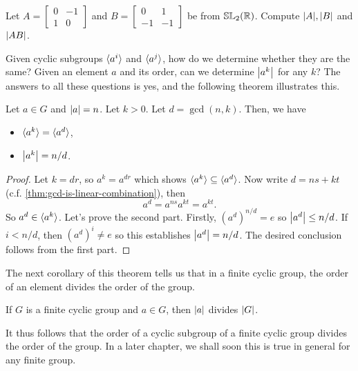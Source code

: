 \documentclass[./algebra-notes.tex]{subfiles}
\begin{document}
\begin{exercise}
    Let $A = \begin{bmatrix} 0 & -1\\ 1 & 0 \end{bmatrix}$ and $B =
    \begin{bmatrix} 0 & 1 \\ -1 & -1 \end{bmatrix}$ be from
    $\mathbb{SL}_2(\mathbb{R})$. Compute $\abs A, \abs B$ and $\abs{AB}$.
\end{exercise}

Given cyclic subgroups ${ \langle a^i \rangle }$ and ${ \langle a^j \rangle }$, how do we determine whether
they are the same? Given an element $a$ and its order, can we determine
$\abs{a^k}$ for any $k$? The answers to all these questions is yes, and the
following theorem illustrates this.
\begin{theorem}
\label{thm:criterion-for-cyclic-subgrou-equivalence}
    Let $a \in G$ and $\abs a = n$. Let $k > 0$. Let $d = \gcd(n, k)$. Then, we
    have
    \begin{itemize}
        \item ${ \langle a^k \rangle } = { \langle a^d \rangle }$,
        \item $\abs{a^k} = n/d$.
    \end{itemize}
\end{theorem}
\begin{proof}
    Let $k = dr$, so $a^k = a^{dr}$ which shows ${ \langle a^k \rangle } \subseteq { \langle a^d \rangle }$.
    Now write $d = ns + kt$ (c.f. \cref{thm:gcd-is-linear-combination}), then
    \[
        a^d = a^{ns} a^{kt} = a^{kt}. 
    \]
    So $a^d \in { \langle a^k \rangle }$. Let's prove the second part. Firstly, $(a^d)^{n/d} =
    e$ so $\abs{a^d} \leq n/d$. If $i < n/d$, then $(a^d)^i \neq e$ so this
    establishes $\abs{a^d} = n/d$. The desired conclusion follows from the first
    part.
\end{proof}

The next corollary of this theorem tells us that in a finite cyclic group, the
order of an element divides the order of the group.
\begin{corollary}
\label{cor:order-element-divides-order-group-fin-cyclic-group}
    If $G$ is a finite cyclic group and $a \in G$, then $\abs a$ divides $\abs
    G$.
\end{corollary}
It thus follows that the order of a cyclic subgroup of a finite cyclic group divides
the order of the group. In a later chapter, we shall soon this is true in
general for any finite group.
\end{document}
